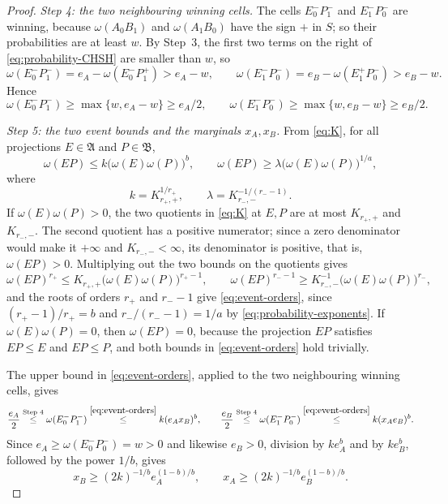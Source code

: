 \documentclass[11pt]{amsart}
\numberwithin{equation}{section}
\theoremstyle{definition}
\newcommand{\A}{\mathfrak A}
\newcommand{\B}{\mathfrak B}
\begin{document}
\begin{proof}
\smallskip
\emph{Step 4: the two neighbouring winning cells.} The cells
\(E_0^-P_1^-\) and \(E_1^-P_0^-\) are winning, because
\(\omega(A_0B_1)\) and \(\omega(A_1B_0)\) have the sign
\(+\) in \(S\); so their probabilities are at least \(w\). By Step~3, the
first two terms on the right of \eqref{eq:probability-CHSH} are smaller
than \(w\), so
\[
 \omega(E_0^-P_1^-)=e_A-\omega(E_0^-P_1^+)>e_A-w,\qquad
 \omega(E_1^-P_0^-)=e_B-\omega(E_1^+P_0^-)>e_B-w.
\]
Hence
\[
 \omega(E_0^-P_1^-)\ge\max\{w,e_A-w\}\ge e_A/2,\qquad
 \omega(E_1^-P_0^-)\ge\max\{w,e_B-w\}\ge e_B/2.
\]

\smallskip
\emph{Step 5: the two event bounds and the marginals \(x_A,x_B\).} From
\eqref{eq:K}, for all projections \(E\in\A\) and \(P\in\B\),
\begin{equation}
 \omega(EP)\le k\bigl(\omega(E)\omega(P)\bigr)^b,\qquad
 \omega(EP)\ge\lambda
       \bigl(\omega(E)\omega(P)\bigr)^{1/a},
 \label{eq:event-orders}
\end{equation}
where
\[
 k=K_{r_+,+}^{1/r_+},\qquad
 \lambda=K_{r_-,-}^{-1/(r_--1)}.
\]
If \(\omega(E)\omega(P)>0\), the two quotients in \eqref{eq:K} at \(E,P\)
are at most \(K_{r_+,+}\) and \(K_{r_-,-}\). The second quotient has a
positive numerator; since a zero denominator would make it \(+\infty\)
and \(K_{r_-,-}<\infty\), its denominator is positive, that is,
\(\omega(EP)>0\). Multiplying out the two bounds on the quotients gives
\[
 \omega(EP)^{r_+}\le K_{r_+,+}\bigl(\omega(E)\omega(P)\bigr)^{r_+-1},
 \qquad
 \omega(EP)^{r_--1}\ge K_{r_-,-}^{-1}\bigl(\omega(E)\omega(P)\bigr)^{r_-},
\]
and the roots of orders \(r_+\) and \(r_--1\) give \eqref{eq:event-orders},
since \((r_+-1)/r_+=b\) and \(r_-/(r_--1)=1/a\) by
\eqref{eq:probability-exponents}. If \(\omega(E)\omega(P)=0\), then
\(\omega(EP)=0\), because the projection \(EP\) satisfies \(EP\le E\) and
\(EP\le P\), and both bounds in \eqref{eq:event-orders} hold trivially.

The upper bound in \eqref{eq:event-orders}, applied to the two
neighbouring winning cells, gives
\[
 \frac{e_A}2\overset{\text{Step 4}}{\le}\omega(E_0^-P_1^-)
 \overset{\eqref{eq:event-orders}}{\le}k(e_Ax_B)^b,\qquad
 \frac{e_B}2\overset{\text{Step 4}}{\le}\omega(E_1^-P_0^-)
 \overset{\eqref{eq:event-orders}}{\le}k(x_Ae_B)^b.
\]
Since \(e_A\ge\omega(E_0^-P_0^-)=w>0\) and likewise \(e_B>0\), division by
\(ke_A^b\) and by \(ke_B^b\), followed by the power \(1/b\), gives
\[
 x_B\ge(2k)^{-1/b}e_A^{(1-b)/b},\qquad
 x_A\ge(2k)^{-1/b}e_B^{(1-b)/b}.
\]


\end{proof}
\end{document}
